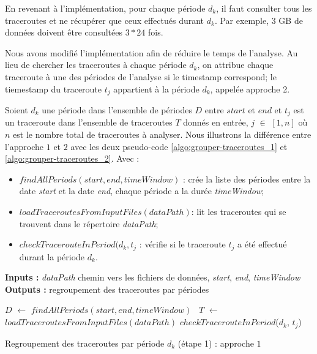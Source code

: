 En revenant à l'implémentation, pour chaque période $d_k$, il faut consulter tous les traceroutes et ne récupérer que ceux effectués durant $d_k$. Par exemple, 3 GB de données doivent être consultées $ 3 * 24 $ fois. 


Nous avons modifié l'implémentation afin de réduire le temps de l'analyse. Au lieu de chercher les traceroutes à chaque période $d_k$,  on attribue chaque traceroute à une des périodes de l'analyse si le timestamp correspond; le tiemestamp du traceroute $t_{j}$ appartient à la période $d_k$, appelée approche 2.


Soient $d_k$ une période dans l'ensemble de périodes $D$  entre $ start $ et $ end $ et $t_{j}$ est un traceroute dans l'ensemble de traceroutes $T$ donnés en entrée, $j$ $\in$ $[1, n]$ où $n$ est le nombre total de traceroutes à analyser. Nous illustrons la différence entre l'approche $ 1 $ et $ 2 $ avec les deux pseudo-code \ref{algo:grouper-traceroutes_1} et 	\ref{algo:grouper-traceroutes_2}. Avec :

\begin{itemize}
	\item $ findAllPeriods(start, end, timeWindow)  $ : crée la liste des périodes entre la date  \textit{start} et la date \textit{end}, chaque période a la durée \textit{timeWindow};
	
	\item  $ loadTraceroutesFromInputFiles(dataPath)  $: lit les traceroutes qui se trouvent dans le répertoire  \textit{dataPath};
	
	\item   $ checkTracerouteInPeriod (d_k, t_{j}$ : vérifie si le traceroute $ t_{j}  $ a été effectué durant la période $d_k$.
\end{itemize}


\begin{algorithm}[H]
	\hspace*{\algorithmicindent} \textbf{Inputs :} \textit{dataPath} chemin vers les fichiers de données, \textit{start}, \textit{end}, \textit{timeWindow}\\
	\hspace*{\algorithmicindent} \textbf{Outputs :} regroupement des traceroutes par périodes
	\begin{algorithmic}[1]
	\State $D$ $\leftarrow$ $ findAllPeriods(start, end, timeWindow) $
	 \
	\State $T$ $\leftarrow$ \textit{$ loadTraceroutesFromInputFiles(dataPath) $}
	\ForAll{$t_{j}$ $\in$ $T$}
	\State $ checkTracerouteInPeriod $($d_k$, $t_{j}$) 
	\EndFor
	\EndFor
\end{algorithmic}
	\caption{Regroupement des traceroutes par période $d_k$ (étape 1) : approche $ 1 $}
	\label{algo:grouper-traceroutes_1}
\end{algorithm}

